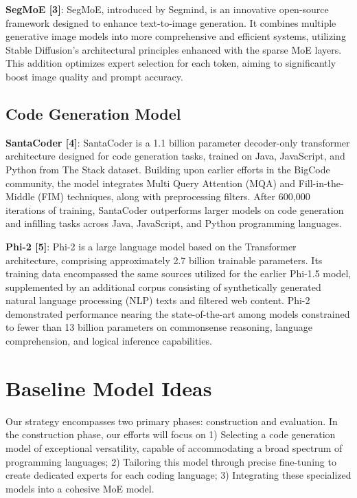 \documentclass{article}
\begin{document}
	\textbf{SegMoE [3]}: SegMoE, introduced by Segmind, is an innovative open-source
	framework designed to enhance text-to-image generation. It combines multiple
	generative image models into more comprehensive and efficient systems, utilizing
	Stable Diffusion's architectural principles enhanced with the sparse MoE layers.
	This addition optimizes expert selection for each token, aiming to significantly
	boost image quality and prompt accuracy.

	\subsection{Code Generation Model}

	\textbf{SantaCoder [4]}: SantaCoder is a 1.1 billion parameter decoder-only
	transformer architecture designed for code generation tasks, trained on Java,
	JavaScript, and Python from The Stack dataset. Building upon earlier efforts
	in the BigCode community, the model integrates Multi Query Attention (MQA) and
	Fill-in-the-Middle (FIM) techniques, along with preprocessing filters. After 600,000
	iterations of training, SantaCoder outperforms larger models on code
	generation and infilling tasks across Java, JavaScript, and Python programming
	languages.

	\textbf{Phi-2 [5]}: Phi-2 is a large language model based on the Transformer
	architecture, comprising approximately 2.7 billion trainable parameters. Its
	training data encompassed the same sources utilized for the earlier Phi-1.5
	model, supplemented by an additional corpus consisting of synthetically generated
	natural language processing (NLP) texts and filtered web content. Phi-2
	demonstrated performance nearing the state-of-the-art among models constrained
	to fewer than 13 billion parameters on commonsense reasoning, language comprehension,
	and logical inference capabilities.

	\section{Baseline Model Ideas}

	Our strategy encompasses two primary phases: construction and evaluation. In the
	construction phase, our efforts will focus on 1) Selecting a code generation model
	of exceptional versatility, capable of accommodating a broad spectrum of
	programming languages; 2) Tailoring this model through precise fine-tuning to
	create dedicated experts for each coding language; 3) Integrating these
	specialized models into a cohesive MoE model.
\end{document}
